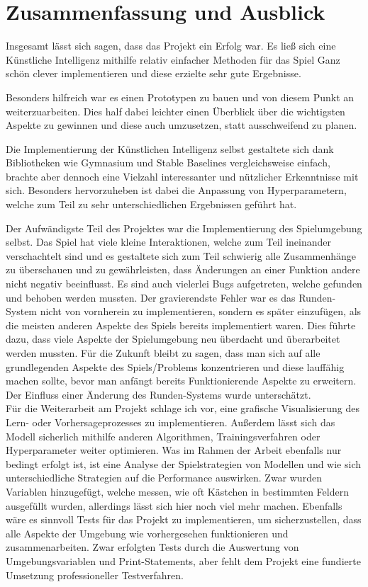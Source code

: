 \section{Zusammenfassung und Ausblick}

Insgesamt lässt sich sagen, dass das Projekt ein Erfolg war. Es ließ sich eine Künstliche Intelligenz mithilfe relativ einfacher Methoden für das Spiel Ganz schön clever implementieren und diese erzielte sehr gute Ergebnisse. 

Besonders hilfreich war es einen Prototypen zu bauen und von diesem Punkt an weiterzuarbeiten. Dies half dabei leichter einen Überblick über die wichtigsten Aspekte zu gewinnen und diese auch umzusetzen, statt ausschweifend zu planen. 

Die Implementierung der Künstlichen Intelligenz selbst gestaltete sich dank Bibliotheken wie Gymnasium und Stable Baselines vergleichsweise einfach, brachte aber dennoch eine Vielzahl interessanter und nützlicher Erkenntnisse mit sich. Besonders hervorzuheben ist dabei die Anpassung von Hyperparametern, welche zum Teil zu sehr unterschiedlichen Ergebnissen geführt hat. 

Der Aufwändigste Teil des Projektes war die Implementierung des Spielumgebung selbst. Das Spiel hat viele kleine Interaktionen, welche zum Teil ineinander verschachtelt sind und es gestaltete sich zum Teil schwierig alle Zusammenhänge zu überschauen und zu gewährleisten, dass Änderungen an einer Funktion andere nicht negativ beeinflusst. Es sind auch vielerlei Bugs aufgetreten, welche gefunden und behoben werden mussten. Der gravierendste Fehler war es das Runden-System nicht von vornherein zu implementieren, sondern es später einzufügen, als die meisten anderen Aspekte des Spiels bereits implementiert waren. Dies führte dazu, dass viele Aspekte der Spielumgebung neu überdacht und überarbeitet werden mussten. Für die Zukunft bleibt zu sagen, dass man sich auf alle grundlegenden Aspekte des Spiels/Problems konzentrieren und diese lauffähig machen sollte, bevor man anfängt bereits Funktionierende Aspekte zu erweitern. Der Einfluss einer Änderung des Runden-Systems wurde unterschätzt.\\

Für die Weiterarbeit am Projekt schlage ich vor, eine grafische Visualisierung des Lern- oder Vorhersageprozesses zu implementieren. Außerdem lässt sich das Modell sicherlich mithilfe anderen Algorithmen, Trainingsverfahren oder Hyperparameter weiter optimieren. Was im Rahmen der Arbeit ebenfalls nur bedingt erfolgt ist, ist eine Analyse der Spielstrategien von Modellen und wie sich unterschiedliche Strategien auf die Performance auswirken. Zwar wurden Variablen hinzugefügt, welche messen, wie oft Kästchen in bestimmten Feldern ausgefüllt wurden, allerdings lässt sich hier noch viel mehr machen. Ebenfalls wäre es sinnvoll Tests für das Projekt zu implementieren, um sicherzustellen, dass alle Aspekte der Umgebung wie vorhergesehen funktionieren und zusammenarbeiten. Zwar erfolgten Tests durch die Auswertung von Umgebungsvariablen und Print-Statements, aber fehlt dem Projekt eine fundierte Umsetzung professioneller Testverfahren.